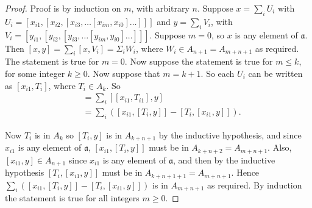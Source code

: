 \documentclass[honours]{UNSWthesis}
\newcommand{\1}{\mathbf{e}_{1}}
\newcommand{\2}{\mathbf{e}_{3}}
\newcommand{\3}{\mathbf{e}_{3}}
\begin{document}
\begin{proof}
Proof is by induction on $m$, with arbitrary $n$. Suppose $x=\sum\limits_{i} U_{i}$ with $U_{i}=[x_{i1},[x_{i2},[x_{i3},\ldots [x_{im},x_{i0}]\ldots]]]$ and $y=\sum\limits_{i} V_{i}$, with $V_{i}=[y_{i1},[y_{i2},[y_{i3},\ldots [y_{im},y_{i0}]\ldots]]]$.
\newline
Suppose $m=0$, so $x$ is any element of $\mathfrak{a}$. Then $[x,y]=\sum\limits_{i}[x,V_{i}]=\Sigma_{i}W_{i}$, where $W_{i} \in A_{n+1}=A_{m+n+1}$ as required. The statement is true for $m=0$. \newline
Now suppose the statement is true for $m \leq k$, for some integer $k \geq 0$. Now suppose that $m=k+1$. So each $U_{i}$ can be written as $[x_{i1},T_{i}]$, where $T_{i} \in A_{k}$. So
\begin{align*}
[x,y] &=\sum\limits_{i}[[x_{i1},T_{i1}],y] \\
&= \sum\limits_{i}([x_{i1},[T_{i},y]]-[T_{i},[x_{i1},y]]).
\end{align*}

Now $T_{i}$ is in $A_{k}$ so $[T_{i},y]$ is in $A_{k+n+1}$ by the inductive hypothesis, and since $x_{i1}$ is any element of $\mathfrak{a}$, $[x_{i1},[T_{i},y]]$ must be in $A_{k+n+2}=A_{m+n+1}$. \newline
Also, $[x_{i1},y] \in A_{n+1}$ since $x_{i1}$ is any element of $\mathfrak{a}$, and then by the inductive hypothesis $[T_{i},[x_{i1},y]]$ must be in $A_{k+n+1+1}=A_{m+n+1}$. \newline
Hence $\sum\limits_{i}([x_{i1},[T_{i},y]]-[T_{i},[x_{i1},y]])$ is in $A_{m+n+1}$ as required. By induction the statement is true for all integers $m \geq 0$.
\end{proof}



\end{document}
